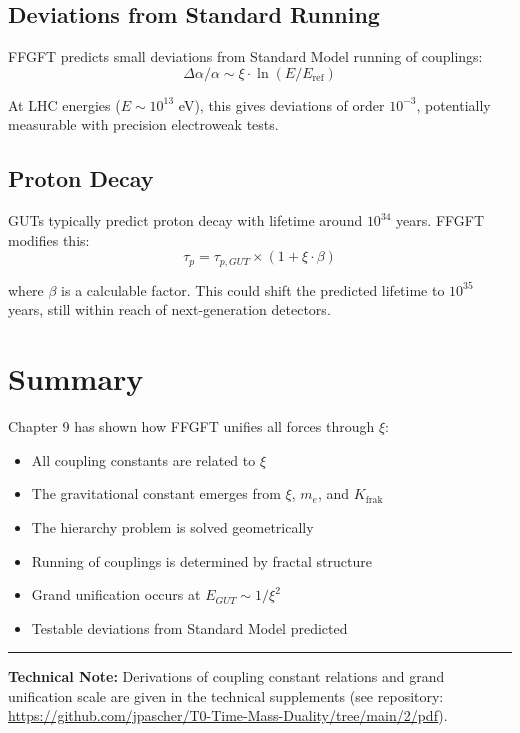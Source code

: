 \subsection{Deviations from Standard Running}

FFGFT predicts small deviations from Standard Model running of couplings:
\begin{equation}
\Delta \alpha / \alpha \sim \xi \cdot \ln(E/E_{\text{ref}})
\end{equation}

At LHC energies ($E \sim 10^{13}$ eV), this gives deviations of order $10^{-3}$, potentially measurable with precision electroweak tests.

\subsection{Proton Decay}

GUTs typically predict proton decay with lifetime around $10^{34}$ years. FFGFT modifies this:
\begin{equation}
\tau_p = \tau_{p,GUT} \times (1 + \xi \cdot \beta)
\end{equation}

where $\beta$ is a calculable factor. This could shift the predicted lifetime to $10^{35}$ years, still within reach of next-generation detectors.

\section{Summary}

Chapter 9 has shown how FFGFT unifies all forces through $\xi$:

\begin{itemize}[leftmargin=*]
\item All coupling constants are related to $\xi$
\item The gravitational constant emerges from $\xi$, $m_e$, and $K_{\text{frak}}$
\item The hierarchy problem is solved geometrically
\item Running of couplings is determined by fractal structure
\item Grand unification occurs at $E_{GUT} \sim 1/\xi^2$
\item Testable deviations from Standard Model predicted
\end{itemize}

\vspace{1cm}
\hrule
\vspace{0.5cm}
\noindent\textbf{Technical Note:} Derivations of coupling constant relations and grand unification scale are given in the technical supplements (see repository: \url{https://github.com/jpascher/T0-Time-Mass-Duality/tree/main/2/pdf}).



